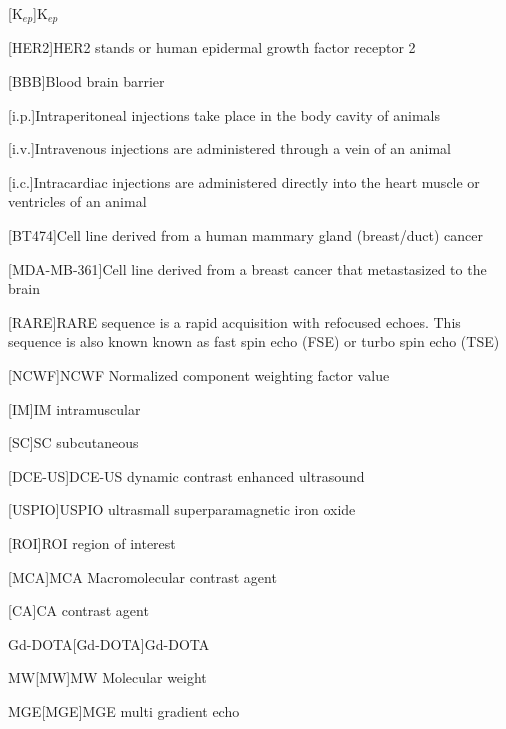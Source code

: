 \begin{acronym}
[K$_{ep}$]{K$_{ep}$}

[HER2]{HER2 stands or human epidermal growth factor receptor 2}

[BBB]{Blood brain barrier}

[i.p.]{Intraperitoneal injections take place in the body cavity of animals}

[i.v.]{Intravenous injections are administered through a vein of an animal}

[i.c.]{Intracardiac injections are administered directly into the heart muscle or ventricles of an animal}

[BT474]{Cell line derived from a human mammary gland (breast/duct) cancer}

[MDA-MB-361]{Cell line derived from a breast cancer that metastasized to the brain}

[RARE]{RARE sequence is a rapid acquisition with refocused echoes. This sequence is also known known as fast spin echo (FSE) or turbo spin echo (TSE)}

[NCWF]{NCWF Normalized component weighting factor value}

[IM]{IM intramuscular}

[SC]{SC subcutaneous}

[DCE-US]{DCE-US dynamic contrast enhanced ultrasound}

[USPIO]{USPIO ultrasmall superparamagnetic iron oxide}

[ROI]{ROI region of interest}

[MCA]{MCA Macromolecular contrast agent}

[CA]{CA contrast agent}

\acs{Gd-DOTA}[Gd-DOTA]{Gd-DOTA}

\acs{MW}[MW]{MW Molecular weight}

\acs{MGE}[MGE]{MGE multi gradient echo}

\end{acronym}

% 
